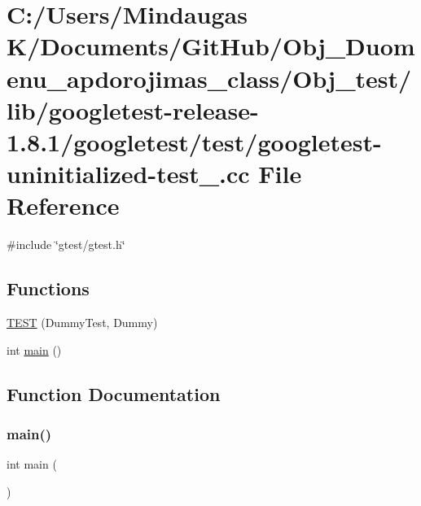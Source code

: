 \hypertarget{_obj__test_2lib_2googletest-release-1_88_81_2googletest_2test_2googletest-uninitialized-test___8cc}{}\section{C\+:/\+Users/\+Mindaugas K/\+Documents/\+Git\+Hub/\+Obj\+\_\+\+Duomenu\+\_\+apdorojimas\+\_\+class/\+Obj\+\_\+test/lib/googletest-\/release-\/1.8.1/googletest/test/googletest-\/uninitialized-\/test\+\_\+.cc File Reference}
\label{_obj__test_2lib_2googletest-release-1_88_81_2googletest_2test_2googletest-uninitialized-test___8cc}
{\ttfamily \#include \char`\"{}gtest/gtest.\+h\char`\"{}}\newline
\subsection*{Functions}
\begin{DoxyCompactItemize}
\item 
\mbox{\hyperlink{_obj__test_2lib_2googletest-release-1_88_81_2googletest_2test_2googletest-uninitialized-test___8cc_a63812c9ef0cbc6907a251ccf919da78e}{T\+E\+ST}} (Dummy\+Test, Dummy)
\item 
int \mbox{\hyperlink{_obj__test_2lib_2googletest-release-1_88_81_2googletest_2test_2googletest-uninitialized-test___8cc_ae66f6b31b5ad750f1fe042a706a4e3d4}{main}} ()
\end{DoxyCompactItemize}


\subsection{Function Documentation}
\mbox{\label{_obj__test_2lib_2googletest-release-1_88_81_2googletest_2test_2googletest-uninitialized-test___8cc_ae66f6b31b5ad750f1fe042a706a4e3d4}} 
\subsubsection{\texorpdfstring{main()}{main()}}
{\footnotesize\ttfamily int main (\begin{DoxyParamCaption}{ }\end{DoxyParamCaption})}

